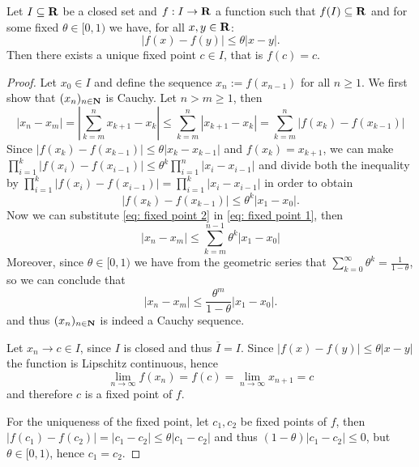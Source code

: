 \begin{theorem}\label{thm: fixed point}
  Let \(I \subseteq \mathbf{R}\) be a closed set and \(f: I \to \mathbf{R}\) a
  function such that \(f(I) \subseteq \mathbf{R}\) and for some fixed \(\theta
  \in [0, 1)\) we have, for all \(x, y \in \mathbf{R}\):
  \[
    |f(x) - f(y)| \leq \theta |x - y|.
  \]
  Then there exists a unique fixed point \(c \in I\), that is \(f(c) = c\).
\end{theorem}

\begin{proof}
  Let \(x_0 \in I\) and define the sequence \(x_n := f(x_{n-1})\) for all \(n
  \geq 1\). We first show that \((x_n)_{n \in \mathbf{N}}\) is Cauchy. Let \(n >
  m \geq 1\), then
  \begin{equation}\label{eq: fixed point 1}
    |x_n - x_m| = \left| \sum_{k=m}^n x_{k+1} - x_k \right|
    \leq \sum_{k=m}^n |x_{k+1} - x_k| = \sum_{k=m}^n |f(x_k) - f(x_{k-1})|
  \end{equation}
  Since \(|f(x_k) - f(x_{k-1})| \leq \theta |x_k - x_{k-1}|\) and \(f(x_k) =
  x_{k+1}\), we can make  \(\prod_{i=1}^k |f(x_i) - f(x_{i-1})| \leq \theta^k
  \prod_{i=1}^n |x_i - x_{i-1}|\) and divide both the inequality by
  \(\prod_{i=1}^k |f(x_i) - f(x_{i-1})| = \prod_{i=1}^k |x_i - x_{i-1}|\) in
  order to obtain
  \begin{equation}\label{eq: fixed point 2}
    |f(x_k) - f(x_{k-1})| \leq \theta^k |x_1 - x_0|.
  \end{equation}
  Now we can substitute \cref{eq: fixed point 2} in \cref{eq: fixed point 1},
  then
  \[
    |x_n - x_m| \leq \sum_{k=m}^{n-1} \theta^k |x_1 - x_0|
  \]
  Moreover, since \(\theta \in [0, 1)\) we have from the geometric series that
  \(\sum_{k=0}^\infty \theta^k = \frac{1}{1-\theta}\), so we can conclude that
  \[
    |x_n - x_m| \leq \frac{\theta^m}{1 - \theta} |x_1 - x_0|.
  \]
  and thus \((x_n)_{n \in \mathbf{N}}\) is indeed a Cauchy sequence.

  Let \(x_n \to c \in I\), since \(I\) is closed and thus \(\overline I = I\).
  Since \(|f(x) - f(y)| \leq \theta |x - y|\) the function is Lipschitz
  continuous, hence
  \[
    \lim_{n \to \infty} f(x_n) = f(c) = \lim_{n \to \infty} x_{n+1} = c
  \]
  and therefore \(c\) is a fixed point of \(f\).

  For the uniqueness of the fixed point, let \(c_1, c_2\) be fixed points of
  \(f\), then \(|f(c_1) - f(c_2)| = |c_1 - c_2| \leq \theta |c_1 - c_2|\) and
  thus \((1 - \theta)|c_1 - c_2| \leq 0\), but \(\theta \in [0, 1)\), hence
  \(c_1 = c_2\).
\end{proof}

